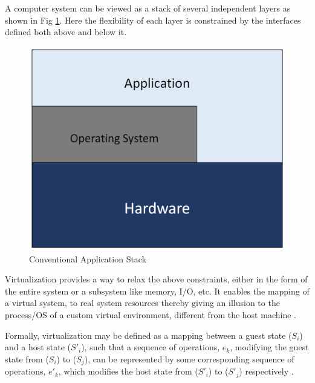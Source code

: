 A computer system can be viewed as a stack of several independent layers as shown in Fig \ref{fig:appstack}. Here the flexibility of each layer is constrained by the interfaces defined both above and below it. 

\setlength{\belowcaptionskip}{-10pt}

\begin{figure}[H]
  \centering
  \includegraphics[scale=0.6]{figures/app_stack.png}
  \caption{Conventional Application Stack}
  \label{fig:appstack}
\end{figure}

Virtualization provides a way to relax the above constraints, either in the form of the entire system or a subsystem like memory, I/O, etc. It enables the mapping of a virtual system, to real system resources thereby giving an illusion to the process/OS of a custom virtual environment, different from the host machine \cite{virt_arch}.

Formally, virtualization may be defined as a mapping between a guest state ($S_i$) and a host state ($S'_i$), such that a sequence of operations, $e_k$, modifying the guest state from ($S_i$) to ($S_j$), can be represented by some corresponding sequence of operations, $e'_k$, which modifies the host state from ($S'_i$) to ($S'_j$) respectively \cite{smith_nair}. 

\setlength{\belowcaptionskip}{-10pt}

